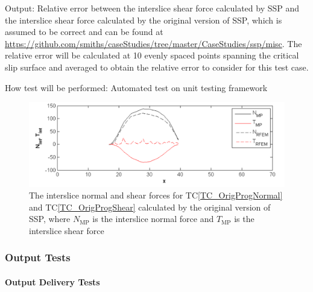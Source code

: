 \documentclass[12pt, titlepage]{article}
\newcommand{\tcref}[1]{TC\ref{#1}}
\newcommand{\progname}{SSP}
\begin{document}
\begin{enumerate}[label=TC\arabic*:,ref={\arabic*}]
Output: Relative error between the interslice shear force calculated by 
\progname{} and the interslice shear force calculated by the original version 
of \progname{}, which is assumed to be correct and can be found at 
\newline
\href{https://github.com/smiths/caseStudies/tree/master/CaseStudies/ssp/misc}
{https://github.com/smiths/caseStudies/tree/master/CaseStudies/ssp/misc}. The 
relative error will be calculated at 10 evenly spaced points spanning the 
critical slip surface and averaged to obtain the relative error to consider for 
this test case.

How test will be performed: Automated test on unit testing framework

\begin{figure}[h!]
	\begin{center}
		\includegraphics[width=1.0\textwidth]{OrigProgForces.png}
		\caption{The interslice normal and shear forces for 
			\tcref{TC_OrigProgNormal} and \tcref{TC_OrigProgShear} calculated 
			by the original version of \progname{}, where $N_\text{MP}$ is the 
			interslice normal force and $T_\text{MP}$ is the interslice shear 
			force}
		\label{OrigProgForces}
	\end{center}
\end{figure}

\end{enumerate}


\subsubsection{Output Tests}

\paragraph{Output Delivery Tests}
\end{document}
